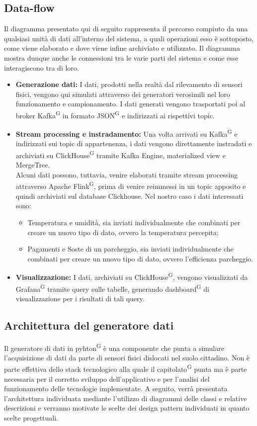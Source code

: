 \documentclass[8pt]{article}
\newcommand{\glossterm}[1]{#1\textsuperscript{G}} %
\begin{document}
\subsection{Data-flow}
Il diagramma presentato qui di seguito rappresenta il percorso compiuto da una qualsiasi unità di dati all'interno del sistema, a quali operazioni esso è sottoposto, come viene elaborato e dove viene infine archiviato e utilizzato. Il diagramma mostra dunque anche le connessioni tra le varie parti del sistema e come esse interagiscono tra di loro.
\begin{itemize}
    \item \textbf{Generazione dati:} I dati, prodotti nella realtà dal rilevamento di sensori fisici, vengono qui simulati attraverso dei generatori verosimili nel loro funzionamento e campionamento. I dati generati vengono trasportati poi al broker \glossterm{Kafka} in formato \glossterm{JSON} e indirizzati ai rispettivi topic.
    \item \textbf{Stream processing e instradamento:} Una volta arrivati su \glossterm{Kafka} e indirizzati sui topic di appartenenza, i dati vengono direttamente instradati e archiviati su \glossterm{ClickHouse} tramite Kafka Engine, materialized view e MergeTree. \\
    Alcuni dati possono, tuttavia, venire elaborati tramite stream processing attraverso Apache \glossterm{Flink}, prima di venire reimmessi in un topic apposito e quindi archiviati sul database Clickhouse. Nel nostro caso i dati interessati sono: 
    \begin{itemize}
    	\item Temperatura e umidità, sia inviati individualmente che combinati per creare un nuovo tipo di dato, ovvero la temperatura percepita;
    	\item Pagamenti e Soste di un parcheggio, sia inviati individualmente che combinati per creare un nuovo tipo di dato, ovvero l'efficienza parcheggio.
    \end{itemize}
    \item \textbf{Visualizzazione:} I dati, archiviati su \glossterm{ClickHouse}, vengono visualizzati da \glossterm{Grafana} tramite query sulle tabelle, generando \glossterm{dashboard} di visualizzazione per i risultati di tali query.
\end{itemize}
\clearpage
\subsection{Architettura del generatore dati}
Il generatore di dati in \glossterm{pyhton} è una componente che punta a simulare l'acquisizione di dati da parte di sensori fisici dislocati nel suolo cittadino. Non è parte effettiva dello stack tecnologico alla quale il \glossterm{capitolato} punta ma è parte necessaria per il corretto sviluppo dell'applicativo e per l'analisi del funzionamento delle tecnologie implementate. A seguito, verrà presentata l’architettura individuata mediante l’utilizzo di diagrammi delle classi e relative descrizioni e verranno motivate le scelte dei design pattern individuati in quanto scelte progettuali.
\end{document}
